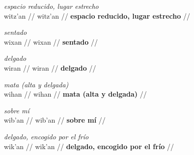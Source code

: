\documentclass{article}%
\begin{document}
%
\par\medskip%
\ex
\textit{espacio reducido, lugar estrecho} \\
\begingl
\gla witz'an //
\glb witz'an //
\glc \textbf{espacio reducido, lugar estrecho} //
\endgl
\xe
%
\medskip%
\par\medskip%
\ex
\textit{sentado} \\
\begingl
\gla wixan //
\glb wixan //
\glc \textbf{sentado} //
\endgl
\xe
%
\medskip%
\par\medskip%
\ex
\textit{delgado} \\
\begingl
\gla wiran //
\glb wiran //
\glc \textbf{delgado} //
\endgl
\xe
%
\medskip%
\par\medskip%
\ex
\textit{mata (alta y delgada)} \\
\begingl
\gla wihan //
\glb wihan //
\glc \textbf{mata (alta y delgada)} //
\endgl
\xe
%
\medskip%
\par\medskip%
\ex
\textit{sobre mí} \\
\begingl
\gla wib'an //
\glb wib'an //
\glc \textbf{sobre mí} //
\endgl
\xe
%
\medskip%
\par\medskip%
\ex
\textit{delgado, encogido por el frío} \\
\begingl
\gla wik'an //
\glb wik'an //
\glc \textbf{delgado, encogido por el frío} //
\endgl
\xe
%
\medskip

%
\end{document}
